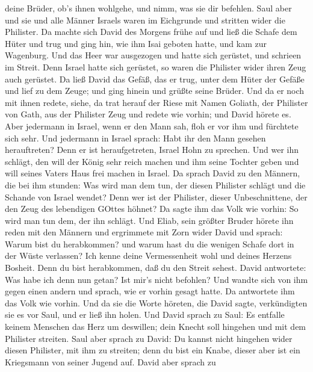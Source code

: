 deine Brüder, ob's ihnen wohlgehe, und nimm, was sie dir befehlen.
 Saul aber und sie und alle Männer Israels waren im
Eichgrunde und stritten wider die Philister.  Da machte
sich David des Morgens frühe auf und ließ die Schafe dem Hüter und trug
und ging hin, wie ihm Isai geboten hatte, und kam zur Wagenburg. Und das
Heer war ausgezogen und hatte sich gerüstet, und schrieen im Streit.
 Denn Israel hatte sich gerüstet, so waren die Philister
wider ihren Zeug auch gerüstet.  Da ließ David das Gefäß,
das er trug, unter dem Hüter der Gefäße und lief zu dem Zeuge; und ging
hinein und grüßte seine Brüder.  Und da er noch mit ihnen
redete, siehe, da trat herauf der Riese mit Namen Goliath, der Philister
von Gath, aus der Philister Zeug und redete wie vorhin; und David hörete
es.  Aber jedermann in Israel, wenn er den Mann sah, floh
er vor ihm und fürchtete sich sehr.  Und jedermann in
Israel sprach: Habt ihr den Mann gesehen herauftreten? Denn er ist
heraufgetreten, Israel Hohn zu sprechen. Und wer ihn schlägt, den will
der König sehr reich machen und ihm seine Tochter geben und will seines
Vaters Haus frei machen in Israel.  Da sprach David zu den
Männern, die bei ihm stunden: Was wird man dem tun, der diesen Philister
schlägt und die Schande von Israel wendet? Denn wer ist der Philister,
dieser Unbeschnittene, der den Zeug des lebendigen GOttes höhnet?
 Da sagte ihm das Volk wie vorhin: So wird man tun dem, der
ihn schlägt.  Und Eliab, sein größter Bruder hörete ihn
reden mit den Männern und ergrimmete mit Zorn wider David und sprach:
Warum bist du herabkommen? und warum hast du die wenigen Schafe dort in
der Wüste verlassen? Ich kenne deine Vermessenheit wohl und deines
Herzens Bosheit. Denn du bist herabkommen, daß du den Streit sehest.
 David antwortete: Was habe ich denn nun getan? Ist mir's
nicht befohlen?  Und wandte sich von ihm gegen einen andern
und sprach, wie er vorhin gesagt hatte. Da antwortete ihm das Volk wie
vorhin.  Und da sie die Worte höreten, die David sagte,
verkündigten sie es vor Saul, und er ließ ihn holen.  Und
David sprach zu Saul: Es entfalle keinem Menschen das Herz um deswillen;
dein Knecht soll hingehen und mit dem Philister streiten. 
Saul aber sprach zu David: Du kannst nicht hingehen wider diesen
Philister, mit ihm zu streiten; denn du bist ein Knabe, dieser aber ist
ein Kriegsmann von seiner Jugend auf.  David aber sprach zu
